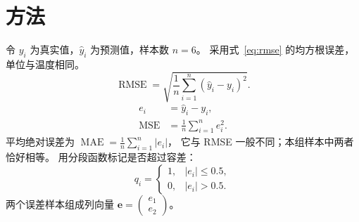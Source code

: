 \section{方法}\label{sec:method}
令 $y_i$ 为真实值，$\hat y_i$ 为预测值，样本数 $n=6$。
采用式~\eqref{eq:rmse} 的均方根误差，单位与温度相同。
\begin{equation}
 \operatorname{RMSE}=\sqrt{\frac{1}{n}\sum_{i=1}^{n}(\hat y_i-y_i)^2}.
 \label{eq:rmse}
\end{equation}
\begin{align}
 e_i &= \hat y_i-y_i,\label{eq:error}\\
 \operatorname{MSE} &= \frac{1}{n}\sum_{i=1}^{n}e_i^2.\label{eq:mse}
\end{align}
平均绝对误差为 $\operatorname{MAE}=\frac{1}{n}\sum_{i=1}^{n}|e_i|$，
它与 RMSE 一般不同；本组样本中两者恰好相等。
用分段函数标记是否超过容差：
\begin{equation*}
 q_i=\begin{cases}1,&|e_i|\leq 0.5,\\0,&|e_i|>0.5.\end{cases}
\end{equation*}
两个误差样本组成列向量 $\boldsymbol e=\begin{pmatrix}e_1\\e_2\end{pmatrix}$。

